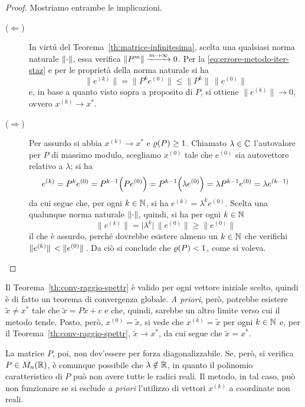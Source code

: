 	\begin{proof}
		Mostriamo entrambe le implicazioni.
		
		\begin{description}
			\item[(\(\Leftarrow\))] In virtú del Teorema~\ref{th:matrice-infinitesima}, scelta una qualsiasi norma naturale \(\norm{\cdot}\), essa verifica \(\norm{P^m} \xrightarrow{m \to \infty} 0\). Per la \eqref{eq:errore-metodo-iter-staz} e per le proprietà della norma naturale si ha
			\begin{equation*}
				\bigl\| e^{(k)} \bigr\| = \bigl\| P^k e^{(0)} \bigr\| \le \bigl\| P^k \bigr\| \, \bigl\| e^{(0)} \bigr\|
			\end{equation*}
			e, in base a quanto visto sopra a proposito di \(P\), si ottiene \(\bigl\| e^{(k)} \bigr\| \to 0\), ovvero \(x^{(k)} \to x^*\).
			\item[(\(\Rightarrow\))] Per assurdo si abbia \(x^{(k)} \to x^*\) e \(\operatorname{\varrho} (P) \ge 1\). Chiamato \(\lambda \in \mathbb{C}\) l'autovalore per \(P\) di massimo modulo, scegliamo \(x^{(0)}\) tale che \(e^{(0)}\) sia autovettore relativo a \(\lambda\); si ha
			\begin{equation*}
				e^{(k)} = P^k e^{(0)} = P^{k - 1} \qty(P e^{(0)}) = P^{k - 1} \qty(\lambda e^{(0)}) = \lambda P^{k - 1} e^{(0)} = \lambda e^{(k - 1)}
			\end{equation*}
			da cui segue che, per ogni \(k \in \mathbb{N}\), si ha \(e^{(k)} = \lambda^k e^{(0)}\). Scelta una qualunque norma naturale \(\norm{\cdot}\), quindi, si ha per ogni \(k \in \mathbb{N}\)
			\begin{equation*}
				\bigl\| e^{(k)} \bigr\| = \bigl| \lambda^k \bigr| \, \bigl\| e^{(0)} \bigr\| \ge \bigl\| e^{(0)} \bigr\|
			\end{equation*}
			il che è assurdo, perché dovrebbe esistere almeno un \(k \in \mathbb{N}\) che verifichi \(\norm*{e^{(k)}} < \norm*{e^{(0)}}\). Da ciò si conclude che \(\operatorname{\varrho} (P) < 1\), come si voleva. \qedhere
		\end{description}
	\end{proof}

	\begin{osservazione}
		Il Teorema~\ref{th:conv-raggio-spettr} è valido per ogni vettore iniziale scelto, quindi è di fatto un teorema di convergenza globale. \emph{A priori}, però, potrebbe esistere \(\tilde{x} \ne x^*\) tale che \(\tilde{x} = P \tilde{x} + c\) e che, quindi, sarebbe un altro limite verso cui il metodo tende. Posto, però, \(x^{(0)} = \tilde{x}\), si vede che \(x^{(k)} = \tilde{x}\) per ogni \(k \in \mathbb{N}\) e, per il Teorema~\ref{th:conv-raggio-spettr}, \(\tilde{x} \to x^*\), da cui segue che \(\tilde{x} = x^*\).
		
		La matrice \(P\), poi, non dev'essere per forza diagonalizzabile. Se, però, si verifica \(P \in M_n (\mathbb{R})\), è comunque possibile che \(\lambda \notin \mathbb{R}\), in quanto il polinomio caratteristico di \(P\) può non avere tutte le radici reali. Il metodo, in tal caso, può non funzionare se si esclude \emph{a priori} l'utilizzo di vettori \(x^{(k)}\) a coordinate non reali.
	\end{osservazione}

